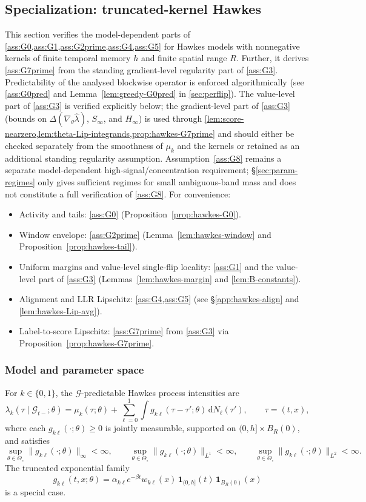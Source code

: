 \documentclass{statsoc}
\newcommand{\dd}{\mathrm{d}}
\newcommand{\1}{\mathbbm{1}}
\begin{document}
\subsection{Specialization: truncated-kernel Hawkes}\label{app:hawkes}

This section verifies the model-dependent parts of \cref{ass:G0,ass:G1,ass:G2prime,ass:G4,ass:G5} for Hawkes models with nonnegative kernels of finite temporal memory \(h\) and finite spatial range \(R\). Further, it derives \cref{ass:G7prime} from the standing gradient-level regularity part of \cref{ass:G3}. Predictability of the analysed blockwise operator is enforced algorithmically (see \cref{ass:G0pred} and Lemma~\ref{lem:greedy-G0pred} in \cref{sec:perflip}). The value-level part of \cref{ass:G3} is verified explicitly below; the gradient-level part of \cref{ass:G3} (bounds on \(\Delta(\nabla_\theta\widehat\lambda)\), \(S_\infty\), and \(H_\infty\)) is used through \cref{lem:score-nearzero,lem:theta-Lip-integrands,prop:hawkes-G7prime} and should either be checked separately from the smoothness of \(\mu_k\) and the kernels or retained as an additional standing regularity assumption. Assumption~\ref{ass:G8} remains a separate model-dependent high-signal/concentration requirement; \S\ref{sec:param-regimes} only gives sufficient regimes for small ambiguous-band mass and does not constitute a full verification of \cref{ass:G8}. For convenience:
\begin{itemize}[nosep]
\item Activity and tails: \cref{ass:G0} (Proposition~\ref{prop:hawkes-G0}).
\item Window envelope: \cref{ass:G2prime} (Lemma~\ref{lem:hawkes-window} and Proposition~\ref{prop:hawkes-tail}).
\item Uniform margins and value-level single-flip locality: \cref{ass:G1} and the value-level part of \cref{ass:G3} (Lemmas~\ref{lem:hawkes-margin} and \ref{lem:B-constants}).
\item Alignment and LLR Lipschitz: \cref{ass:G4,ass:G5} (see \S\ref{app:hawkes-align} and \cref{lem:hawkes-Lip-avg}).
\item Label-to-score Lipschitz: \cref{ass:G7prime} from \cref{ass:G3} via Proposition~\ref{prop:hawkes-G7prime}.
\end{itemize}

\subsubsection{Model and parameter space}
For $k\in\{0,1\}$, the $\mathcal G$-predictable Hawkes process intensities are
\[
\lambda_k(\tau\mid \mathcal G_{t-};\theta)
=\mu_k(\tau;\theta)+\sum_{\ell=0}^1\int g_{k\ell}(\tau-\tau';\theta)\,\dd N_\ell(\tau'),
\qquad \tau=(t,x),
\]
where each \(g_{k\ell}(\cdot;\theta)\ge 0\) is jointly measurable, supported on \((0,h]\times B_R(0)\), and satisfies
\[
\sup_{\theta\in\Theta_\circ}\|g_{k\ell}(\cdot;\theta)\|_\infty<\infty,\qquad
\sup_{\theta\in\Theta_\circ}\|g_{k\ell}(\cdot;\theta)\|_{L^1}<\infty,\qquad
\sup_{\theta\in\Theta_\circ}\|g_{k\ell}(\cdot;\theta)\|_{L^2}<\infty.
\]
The truncated exponential family
\[
g_{k\ell}(t,x;\theta)=\alpha_{k\ell}e^{-\beta t}w_{k\ell}(x)\,\mathbf 1_{(0,h]}(t)\,\mathbf 1_{B_R(0)}(x)
\]
is a special case.
\end{document}
